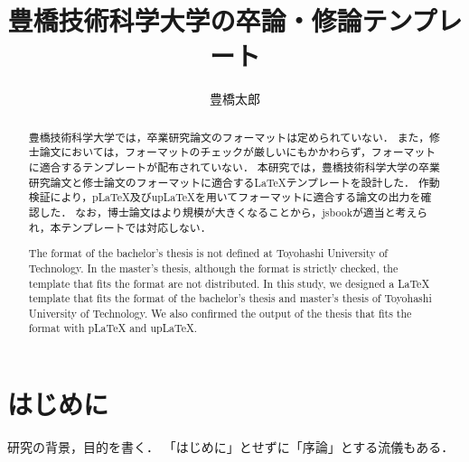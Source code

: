 \documentclass[a4paper,11ptj,dvipdfmx]{jsreport} %
\title{豊橋技術科学大学の卒論・修論テンプレート}
\author{豊橋太郎}
\begin{document}
\maketitle

\begin{abstract}
豊橋技術科学大学では，卒業研究論文のフォーマットは定められていない．
また，修士論文においては，フォーマットのチェックが厳しいにもかかわらず，フォーマットに適合するテンプレートが配布されていない．
本研究では，豊橋技術科学大学の卒業研究論文と修士論文のフォーマットに適合するLaTeXテンプレートを設計した．
作動検証により，pLaTeX及びupLaTeXを用いてフォーマットに適合する論文の出力を確認した．
なお，博士論文はより規模が大きくなることから，jsbookが適当と考えられ，本テンプレートでは対応しない．
\par\vspace{3em}
The format of the bachelor's thesis is not defined at Toyohashi University of Technology.
In the master's thesis, although the format is strictly checked, the template that fits the format are not distributed.
In this study, we designed a LaTeX template that fits the format of the bachelor's thesis and master's thesis of Toyohashi University of Technology.
We also confirmed the output of the thesis that fits the format with pLaTeX and upLaTeX.
\end{abstract}

%
%

\setcounter{tocdepth}{3}
\tableofcontents
\listoffigures
\listoftables

\pagebreak \setcounter{page}{1}

\chapter{はじめに}\label{Introduction}
研究の背景，目的を書く．
「はじめに」とせずに「序論」とする流儀もある．

% 

\end{document}
